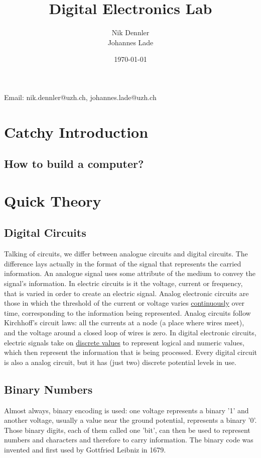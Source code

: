 \documentclass[10pt,a4paper]{article}
\author{Nik Dennler \\ Johannes Lade}
\title{Digital Electronics Lab}
\date{\today{}}
\begin{document}
	
\begin{titlepage}
	\maketitle
		\begin{center}
			Email: nik.dennler@uzh.ch, johannes.lade@uzh.ch
		\end{center}
	\thispagestyle{empty}
\end{titlepage}

\tableofcontents
\newpage

\section{Catchy Introduction}
\subsection{How to build a computer?}


\section{Quick Theory}
\subsection{Digital Circuits}
Talking of circuits, we differ between analogue circuits and digital circuits. The difference lays actually in the format of the signal that represents the carried information. \newline
An analogue signal uses some attribute of the medium to convey the signal's information. In electric circuits is it the voltage, current or frequency, that is varied in order to create an electric signal. Analog electronic circuits are those in which the threshold of the current or voltage varies \underline{continuously} over time, corresponding to the information being represented. Analog circuits follow Kirchhoff's circuit laws: all the currents at a node (a place where wires meet), and the voltage around a closed loop of wires is zero. \newline
In digital electronic circuits, electric signals take on \underline{discrete values} to represent logical and numeric values, which then represent the information that is being processed. Every digital circuit is also a analog circuit, but it has (just two) discrete potential levels in use. 

\subsection{Binary Numbers}
Almost always, binary encoding is used: one voltage represents a binary '1' and another voltage, usually a value near the ground potential, represents a binary '0'. Those binary digits, each of them called one 'bit', can then be used to represent numbers and characters and therefore to carry information. The binary code was invented and first used by Gottfried Leibniz in 1679.
\end{document}
